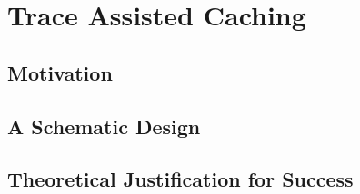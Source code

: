 \chapter{Trace Assisted Caching}

\section{Motivation}

\section{A Schematic Design}

\section{Theoretical Justification for Success}